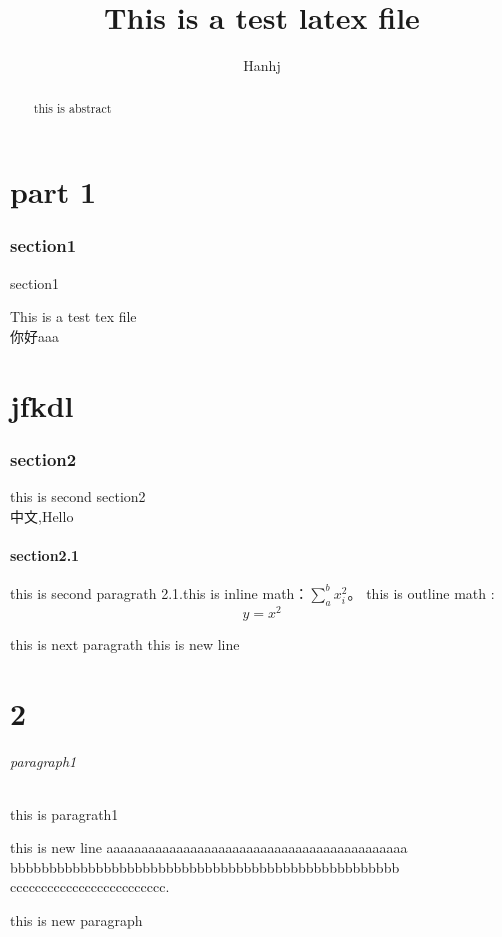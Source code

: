 \documentclass{article}
\begin{document}
\begin{CJK}{UTF8}{gbsn}
	\title {This is a test latex file}
	\author {Hanhj}
	\date {}
	\maketitle
	\tableofcontents
	\begin{abstract}
	\indent this is abstract
	\end{abstract}
	\part{part 1}
	\section{section1}section1
		\par
	    This is a test tex file\\
	你好aaa

        \part{jfkdl}
        \label{part:jk}

        \section{section2}	
		this is second section2\\
		中文,Hello 
		\subsection{section2.1}
		this is second paragrath 2.1.this is inline math：$\sum_a^bx_i^2$。
		this is outline math :$$y=x^2$$
		\par 
		this is next paragrath
		\newline
		this is new line

	\part{2}
	\paragraph{paragraph1}this is paragrath1
	\par
	this is new line aaaaaaaaaaaaaaaaaaaaaaaaaaaaaaaaaaaaaaaaaaa\\
	bbbbbbbbbbbbbbbbbbbbbbbbbbbbbbbbbbbbbbbbbbbbbbbbbb\\
	ccccccccccccccccccccccccc.
	\par 
	this is new paragraph

\end{CJK}
\end{document}
